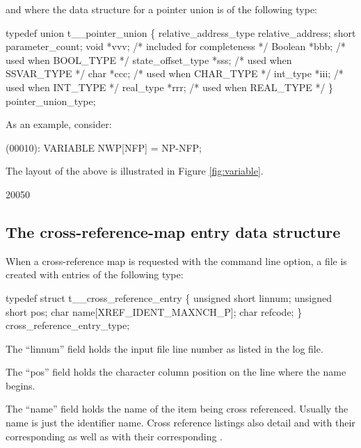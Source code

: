 and where the data structure for a pointer union is of the following type:
\begin{codeexample}
typedef union t__pointer_union
   \{
     relative_address_type relative_address;
     short parameter_count;
     void *vvv;               /* included for completeness */
     Boolean *bbb;            /* used when BOOL_TYPE */
     state_offset_type *sss;  /* used when SSVAR_TYPE */
     char *ccc;               /* used when CHAR_TYPE */
     int_type *iii;           /* used when INT_TYPE */
     real_type *rrr;          /* used when REAL_TYPE */
   \} pointer_union_type;
\end{codeexample}



As an example, consider:
\begin{logfileexample}
(00010): VARIABLE NWP[NFP] = NP-NFP;
\end{logfileexample}

The layout of the above  is illustrated
in Figure \ref{fig:variable}.

\startfig
\begin{fast_picture}{200}{50}
\putuponebox\savFboxpos
\nextFbox{}
\nextFbox{}
\end{fast_picture}

\subsection{The cross-reference-map entry data structure}
\label{sec:xref}

When a cross-reference map is requested with the  
command line option, a file is created with entries of the following
type:
\begin{codeexample}
typedef struct t__cross_reference_entry
   \{
      unsigned short linnum;
      unsigned short pos;
      char name[XREF_IDENT_MAXNCH_P];
      char refcode;
   \} cross_reference_entry_type;
\end{codeexample}


The ``linnum'' field holds the  input file line number
as listed in the log file.

The ``pos'' field holds the character column position on the line where
the name begins.

The ``name'' field holds the name of the item being cross referenced.
Usually the name is just the identifier name.   Cross reference listings
also detail  and  with their corresponding 
as well as  with their corresponding .

